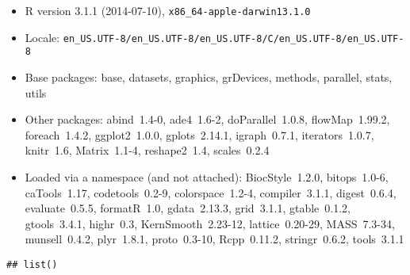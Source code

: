 \documentclass[12pt]{article}\usepackage[]{graphicx}\usepackage[usenames,dvipsnames]{color}
\makeatletter
\newenvironment{kframe}{%
 \def\at@end@of@kframe{}%
 \ifinner\ifhmode%
  \def\at@end@of@kframe{\end{minipage}}%
  \begin{minipage}{\columnwidth}%
 \fi\fi%
 \def\FrameCommand##1{\hskip\@totalleftmargin \hskip-\fboxsep
 \colorbox{shadecolor}{##1}\hskip-\fboxsep
     \hskip-\linewidth \hskip-\@totalleftmargin \hskip\columnwidth}%
 \MakeFramed {\advance\hsize-\width
   \@totalleftmargin\z@ \linewidth\hsize
   \@setminipage}}%
 {\par\unskip\endMakeFramed%
 \at@end@of@kframe}
\newenvironment{knitrout}{}{} %
\makeatother
\begin{document}
\begin{itemize}\raggedright
  \item R version 3.1.1 (2014-07-10), \verb|x86_64-apple-darwin13.1.0|
  \item Locale: \verb|en_US.UTF-8/en_US.UTF-8/en_US.UTF-8/C/en_US.UTF-8/en_US.UTF-8|
  \item Base packages: base, datasets, graphics, grDevices, methods,
    parallel, stats, utils
  \item Other packages: abind~1.4-0, ade4~1.6-2, doParallel~1.0.8,
    flowMap~1.99.2, foreach~1.4.2, ggplot2~1.0.0, gplots~2.14.1,
    igraph~0.7.1, iterators~1.0.7, knitr~1.6, Matrix~1.1-4,
    reshape2~1.4, scales~0.2.4
  \item Loaded via a namespace (and not attached): BiocStyle~1.2.0,
    bitops~1.0-6, caTools~1.17, codetools~0.2-9, colorspace~1.2-4,
    compiler~3.1.1, digest~0.6.4, evaluate~0.5.5, formatR~1.0,
    gdata~2.13.3, grid~3.1.1, gtable~0.1.2, gtools~3.4.1, highr~0.3,
    KernSmooth~2.23-12, lattice~0.20-29, MASS~7.3-34, munsell~0.4.2,
    plyr~1.8.1, proto~0.3-10, Rcpp~0.11.2, stringr~0.6.2, tools~3.1.1
\end{itemize}





\begin{knitrout}
\color{fgcolor}\begin{kframe}
\begin{verbatim}
## list()
\end{verbatim}
\end{kframe}
\end{knitrout}


\end{document}
